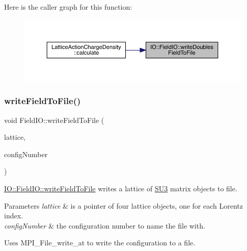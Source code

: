 Here is the caller graph for this function\+:
\nopagebreak
\begin{figure}[H]
\begin{center}
\leavevmode
\includegraphics[width=350pt]{class_i_o_1_1_field_i_o_aaf2bac2025d67c06e7c61e8cc9f44777_icgraph}
\end{center}
\end{figure}
\mbox{\label{class_i_o_1_1_field_i_o_a8af607f9a1d79e90d4514c36103c6601}} 
\subsubsection{\texorpdfstring{writeFieldToFile()}{writeFieldToFile()}}
{\footnotesize\ttfamily void Field\+I\+O\+::write\+Field\+To\+File (\begin{DoxyParamCaption}\item[{\mbox{\hyperlink{class_lattice}{Lattice}}$<$ \mbox{\hyperlink{class_s_u3}{S\+U3}} $>$ $\ast$}]{lattice,  }\item[{unsigned int}]{config\+Number }\end{DoxyParamCaption})\hspace{0.3cm}{\ttfamily [static]}}



\mbox{\hyperlink{class_i_o_1_1_field_i_o_a8af607f9a1d79e90d4514c36103c6601}{I\+O\+::\+Field\+I\+O\+::write\+Field\+To\+File}} writes a lattice of \mbox{\hyperlink{class_s_u3}{S\+U3}} matrix objects to file. 


\begin{DoxyParams}{Parameters}
{\em lattice} & is a pointer of four lattice objects, one for each Lorentz index. \\
\hline
{\em config\+Number} & the configuration number to name the file with.\\
\hline
\end{DoxyParams}
Uses M\+P\+I\+\_\+\+File\+\_\+write\+\_\+at to write the configuration to a file.

